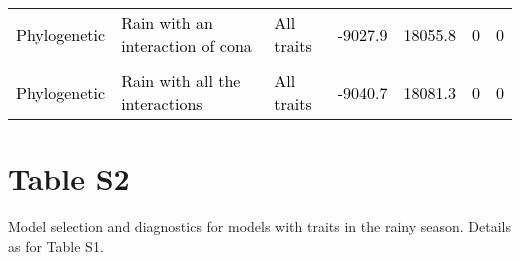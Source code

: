 \documentclass[
  12pt,
  letterpaper,
  DIV=11,
  numbers=noendperiod]{scrartcl}
\begin{document}
\begin{table}[H]
{\begin{tabular}[t]{lllllll}
\textcolor{black}{Phylogenetic} & \textcolor{black}{Rain with an interaction of cona} & \textcolor{black}{All traits} & \textcolor{black}{-9027.9} & \textcolor{black}{18055.8} & \textcolor{black}{0} & \textcolor{black}{0}\\
\cellcolor{gray!6}{\textcolor{black}{Non-phylogenetic}} & \cellcolor{gray!6}{\textcolor{black}{Rain with all the interactions}} & \cellcolor{gray!6}{\textcolor{black}{All traits}} & \cellcolor{gray!6}{\textcolor{black}{-9040.6}} & \cellcolor{gray!6}{\textcolor{black}{18081.1}} & \cellcolor{gray!6}{\textcolor{black}{0}} & \cellcolor{gray!6}{\textcolor{black}{0}}\\
\textcolor{black}{Phylogenetic} & \textcolor{black}{Rain with all the interactions} & \textcolor{black}{All traits} & \textcolor{black}{-9040.7} & \textcolor{black}{18081.3} & \textcolor{black}{0} & \textcolor{black}{0}\\
\bottomrule
\end{tabular}}
\end{table}

\newpage

\hypertarget{table-s2}{%
\section{Table S2}\label{table-s2}}

Model selection and diagnostics for models with traits in the rainy
season. Details as for Table S1.
\end{document}
